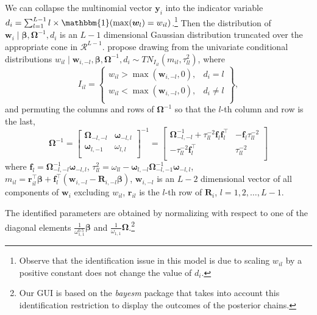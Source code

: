 We can collapse the multinomial vector $\bm{y}_i$ into the indicator variable $d_i=\sum_{l=1}^{L-1}l\times \mathbbm{1}({\max(\bm{w}_{l})=w_{il}})$.\footnote{Observe that the identification issue in this model is due to scaling $w_{il}$ by a positive constant does not change the value of $d_i$.} Then the distribution of $\bm{w}_i\mid \bm{\beta},\bm{\Omega}^{-1},d_i$ is an $L-1$ dimensional Gaussian distribution truncated over the appropriate cone in $\mathcal{R}^{L-1}$.
\cite{McCulloch1994} propose drawing from the univariate conditional distributions $w_{il}\mid \bm{w}_{i,-l},\bm{\beta},\bm{\Omega}^{-1},d_i\sim TN_{I_{il}}(m_{il},\tau_{ll}^2)$, where 
\begin{equation*}
I_{il}=\begin{Bmatrix} w_{il}>\max(\bm{w}_{i,-l},0), & d_i=l\\
	w_{il}<\max(\bm{w}_{i,-l},0), & d_i\neq l\\
\end{Bmatrix},
\end{equation*}
and permuting the columns and rows of $\bm{\Omega}^{-1}$ so that the $l$-th column and row is the last,
\begin{equation*}
	\bm{\Omega}^{-1}=\begin{bmatrix}
		\bm{\Omega}_{-l,-l} & \bm\omega_{-l,l}\\
		\bm\omega_{l,-1} & \omega_{l,l}\\
	\end{bmatrix}^{-1}
	=\begin{bmatrix}
		\bm{\Omega}_{-l,-l}^{-1}+{\tau}^{-2}_{ll}\bm{f}_l\bm{f}_l^{\top} & -\bm{f}_l\tau^{-2}_{ll}\\
		-{\tau}^{-2}_{ll}\bm{f}_l^{\top} & {\tau}^{-2}_{ll}\\
	\end{bmatrix}
\end{equation*}
\noindent where $\bm{f}_l=\bm{\Omega}_{-l,-l}^{-1}\bm{\omega}_{-l,l}$, $\tau_{ll}^2= \omega_{ll}-\bm{\omega}_{l,-l}\bm{\Omega}^{-1}_{-l,-1}\bm{\omega}_{-l,l}$, $m_{il}=\bm{r}_{il}^{\top}\bm{\beta}+\bm{f}_l^{\top}(\bm{w}_{i,-l}-\bm{R}_{i,-l}\bm{\beta})$, $\bm{w}_{i,-l}$ is an $L-2$ dimensional vector of all components of $\bm{w}_i$ excluding $w_{il}$, $\bm{r}_{il}$ is the $l$-th row of $\bm{R}_i$, $l=1,2,\dots,L-1$. 

The identified parameters are obtained by normalizing with respect to one of the diagonal elements $\frac{1}{\omega_{1,1}^{0.5}}\bm{\beta}$ and $\frac{1}{\omega_{1,1}}\bm{\Omega}$.\footnote{Our GUI is based on the \textit{bayesm} package that takes into account this identification restriction to display the outcomes of the posterior chains.}

